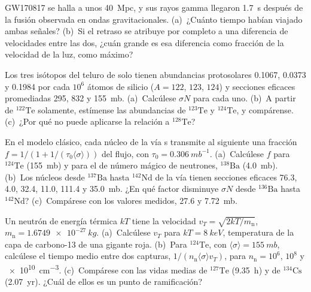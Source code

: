 \begin{exercise}[$\star$]\label{exo:b3:origin-of-elements:4}
GW170817 se halla a unos \qty{40}{Mpc}, y sus rayos gamma llegaron
\qty{1.7}{s} después de la fusión observada en ondas gravitacionales. (a)~¿Cuánto tiempo
habían viajado ambas señales? (b)~Si el retraso se atribuye por completo a
una diferencia de velocidades entre las dos, ¿cuán grande es esa diferencia como
fracción de la velocidad de la luz, como máximo?
\end{exercise}

\begin{exercise}[$\star\star$]\label{exo:b3:origin-of-elements:5}
Los tres isótopos del teluro de solo  tienen abundancias protosolares
\num{0.1067}, \num{0.0373} y \num{0.1984} por cada $10^6$ átomos de silicio
($A = 122$, $123$, $124$) y secciones eficaces promediadas \num{295},
\num{832} y \qty{155}{mb}. (a)~Calcúlese $\sigma N$ para cada uno. (b)~A partir de
$^{122}\mathrm{Te}$ solamente, estímense las abundancias de $^{123}\mathrm{Te}$
y $^{124}\mathrm{Te}$, y compárense. (c)~¿Por qué no puede aplicarse la relación
a $^{128}\mathrm{Te}$?
\end{exercise}

\begin{exercise}[$\star\star$]\label{exo:b3:origin-of-elements:6}
En el modelo clásico, cada núcleo de la vía s transmite al
siguiente una fracción $f = 1/(1 + 1/(\tau_0\langle\sigma\rangle))$ del
flujo, con $\tau_0 = \qty{0.306}{mb^{-1}}$. (a)~Calcúlese $f$ para
$^{124}\mathrm{Te}$ (\qty{155}{mb}) y para el de número mágico de neutrones,
$^{138}\mathrm{Ba}$ (\qty{4.0}{mb}). (b)~Los núcleos desde
$^{137}\mathrm{Ba}$ hasta $^{142}\mathrm{Nd}$ de la vía tienen
secciones eficaces \num{76.3}, \num{4.0}, \num{32.4}, \num{11.0},
\num{111.4} y \qty{35.0}{mb}. ¿En qué factor disminuye $\sigma N$ desde
$^{136}\mathrm{Ba}$ hasta $^{142}\mathrm{Nd}$? (c)~Compárese con los
valores medidos, \num{27.6} y \qty{7.72}{mb}.
\end{exercise}

\begin{exercise}[$\star\star$]\label{exo:b3:origin-of-elements:7}
Un neutrón de energía térmica $kT$ tiene la velocidad
$v_T = \sqrt{2kT/m_\mathrm{n}}$, $m_\mathrm{n} = \qty{1.6749e-27}{kg}$.
(a)~Calcúlese $v_T$ para $kT = \qty{8}{keV}$, temperatura de la
capa de carbono-13 de una gigante roja. (b)~Para $^{124}\mathrm{Te}$, con
$\langle\sigma\rangle = \qty{155}{mb}$, calcúlese el tiempo medio entre
dos capturas, $1/(n_\mathrm{n}\langle\sigma\rangle v_T)$, para
$n_\mathrm{n} = 10^6$, $10^8$ y \qty{e10}{cm^{-3}}. (c)~Compárese con
las vidas medias de $^{127}\mathrm{Te}$ (\qty{9.35}{h}) y de
$^{134}\mathrm{Cs}$ (\qty{2.07}{yr}). ¿Cuál de ellos es un punto de ramificación?
\end{exercise}

